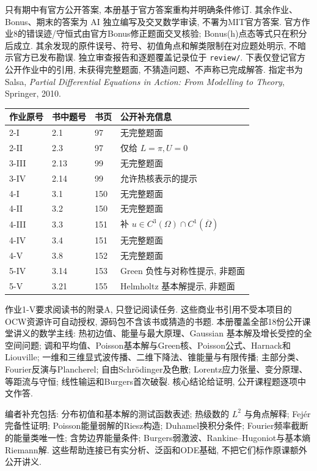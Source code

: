 只有期中有官方公开答案, 本册基于官方答案重构并明确条件修订. 其余作业、Bonus、期末的答案为 AI 独立编写及交叉数学审读, 不署为MIT官方答案. 官方作业8的错误迹/守恒式由官方Bonus修正题面交叉核验; Bonus(h)点态等式只在积分后成立. 其余发现的原件误号、符号、初值角点和解类限制在对应题处明示, 不暗示官方已发布勘误. 独立审查报告和逐题覆盖记录位于 \texttt{review/}.
下表仅登记官方公开作业中的引用, 未获得完整题面, 不猜造问题、不声称已完成解答. 指定书为 Salsa, \textit{Partial Differential Equations in Action: From Modelling to Theory}, Springer, 2010.
\begin{longtable}{p{}p{}p{}p{}}
\toprule 作业原号&书中题号&书页&公开补充信息\\\midrule\endhead
2-I&2.1&97&无完整题面\\
2-II&2.3&97&仅给 $L=\pi,U=0$\\
3-III&2.13&99&无完整题面\\
3-IV&2.14&99&允许热核表示的提示\\
4-I&3.1&150&无完整题面\\
4-II&3.2&150&无完整题面\\
4-III&3.3&151&补 $u\in C^3(\Omega)\cap C^1(\overline\Omega)$\\
4-IV&3.4&151&无完整题面\\
4-V&3.8&152&无完整题面\\
5-IV&3.14&153&Green 负性与对称性提示, 非题面\\
5-V&3.21&155&Helmholtz 基本解提示, 非题面\\\bottomrule
\end{longtable}
作业1-V要求阅读书的附录A, 只登记阅读任务. 这些商业书引用不受本项目的OCW资源许可自动授权, 源码包不含该书或猜造的书题.
本册覆盖全部18份公开课堂讲义的数学主线: 热初边值、能量与最大原理、Gaussian 基本解及增长受控的全空间问题; 调和平均值、Poisson基本解与Green核、Poisson公式、Harnack和Liouville; 一维和三维显式波传播、二维下降法、锥能量与有限传播; 主部分类、Fourier反演与Plancherel; 自由Schrödinger及色散; Lorentz应力张量、变分原理、等距流与守恒; 线性输运和Burgers首次破裂. 核心结论给证明, 公开课程题逐项中文作答.

编者补充包括: 分布初值和基本解的测试函数表述; 热级数的 $L^2$ 与角点解释; Fejér完备性证明; Poisson能量弱解的Riesz构造; Duhamel换积分条件; Fourier频率截断的能量类唯一性; 含势边界能量条件; Burgers弱激波、Rankine--Hugoniot与基本熵Riemann解. 这些帮助连接已有实分析、泛函和ODE基础, 不把它们标作原课额外公开讲义.

